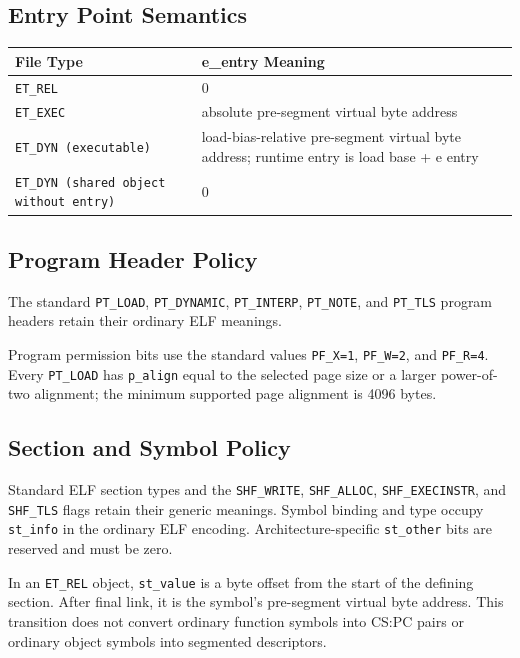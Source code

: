 \documentclass[10pt,twoside]{article}
\begin{document}
\subsection{Entry Point Semantics}
\begingroup\footnotesize
\setlength{\tabcolsep}{2pt}
\begin{longtable}{@{}p{1.75in}p{3.75in}@{}}
\toprule
\textbf{File Type} & \textbf{e\_entry Meaning}\\
\midrule
\endhead
\texttt{ET\_\allowbreak{}REL} & 0\\
\texttt{ET\_\allowbreak{}EXEC} & absolute pre-segment virtual byte address\\
\texttt{ET\_\allowbreak{}DYN (executable)} & load-bias-relative pre-segment virtual byte address; runtime entry is load base + e entry\\
\texttt{ET\_\allowbreak{}DYN (shared object without entry)} & 0\\
\bottomrule
\end{longtable}
\endgroup
\subsection{Program Header Policy}
The standard \texttt{PT\_LOAD}, \texttt{PT\_DYNAMIC},
\texttt{PT\_INTERP}, \texttt{PT\_NOTE}, and \texttt{PT\_TLS} program
headers retain their ordinary ELF meanings.

Program permission bits use the standard values \texttt{PF\_X=1},
\texttt{PF\_W=2}, and \texttt{PF\_R=4}. Every \texttt{PT\_LOAD} has
\texttt{p\_align} equal to the selected page size or a larger power-of-two
alignment; the minimum supported page alignment is 4096 bytes.

\subsection{Section and Symbol Policy}\label{section:section-and-symbol-policy}
Standard ELF section types and the \texttt{SHF\_WRITE},
\texttt{SHF\_ALLOC}, \texttt{SHF\_EXECINSTR}, and \texttt{SHF\_TLS} flags
retain their generic meanings. Symbol binding and type occupy
\texttt{st\_info} in the ordinary ELF encoding. Architecture-specific
\texttt{st\_other} bits are reserved and must be zero.

In an \texttt{ET\_REL} object, \texttt{st\_value} is a byte offset from the
start of the defining section. After final link, it is the symbol's
pre-segment virtual byte address. This transition does not convert ordinary
function symbols into CS:PC pairs or ordinary object symbols into segmented
descriptors.
\end{document}
